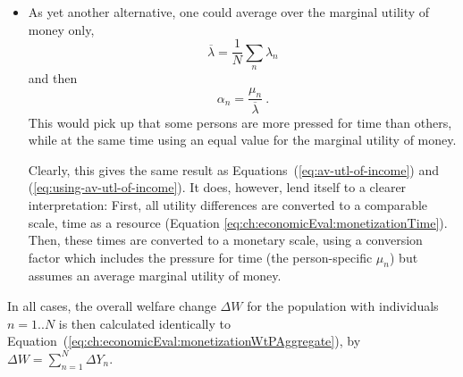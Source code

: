 \begin{itemize}
\item As yet another alternative, one could average over the marginal utility of money only, \ie 
\[
\overline\lambda = \frac{1}{N} \sum_n \lambda_n
\]
and then
\begin{equation}
\alpha_n = \frac{\mu_n}{\overline\lambda} \ .
\label{eq:resource-vot-w-equitable-income}
\end{equation}
This would pick up that some persons are more pressed for time than others, while at the same time using an equal value for the marginal utility of money.

Clearly, this gives the same result as Equations~(\ref{eq:av-utl-of-income}) and (\ref{eq:using-av-utl-of-income}).  It does, however, lend itself to a clearer interpretation: First, all utility differences are converted to a comparable scale, \ie time as a resource (Equation \ref{eq:ch:economicEval:monetizationTime}).  Then, these times are converted to a monetary scale, using a conversion factor which includes the pressure for time (\ie the person-specific $\mu_n$) but assumes an average marginal utility of money. 








\end{itemize}
In all cases, the overall welfare change $\Delta W$ for the population with individuals $n=1..N$ is then calculated identically to Equation~(\ref{eq:ch:economicEval:monetizationWtPAggregate}), \ie by $\Delta W = \sum_{n=1}^N \Delta Y_n$.



